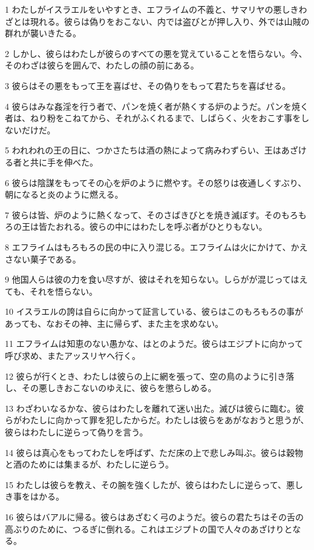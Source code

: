 \par 1 わたしがイスラエルをいやすとき、エフライムの不義と、サマリヤの悪しきわざとは現れる。彼らは偽りをおこない、内では盗びとが押し入り、外では山賊の群れが襲いきたる。
\par 2 しかし、彼らはわたしが彼らのすべての悪を覚えていることを悟らない。今、そのわざは彼らを囲んで、わたしの顔の前にある。
\par 3 彼らはその悪をもって王を喜ばせ、その偽りをもって君たちを喜ばせる。
\par 4 彼らはみな姦淫を行う者で、パンを焼く者が熱くする炉のようだ。パンを焼く者は、ねり粉をこねてから、それがふくれるまで、しばらく、火をおこす事をしないだけだ。
\par 5 われわれの王の日に、つかさたちは酒の熱によって病みわずらい、王はあざける者と共に手を伸べた。
\par 6 彼らは陰謀をもってその心を炉のように燃やす。その怒りは夜通しくすぶり、朝になると炎のように燃える。
\par 7 彼らは皆、炉のように熱くなって、そのさばきびとを焼き滅ぼす。そのもろもろの王は皆たおれる。彼らの中にはわたしを呼ぶ者がひとりもない。
\par 8 エフライムはもろもろの民の中に入り混じる。エフライムは火にかけて、かえさない菓子である。
\par 9 他国人らは彼の力を食い尽すが、彼はそれを知らない。しらがが混じってはえても、それを悟らない。
\par 10 イスラエルの誇は自らに向かって証言している、彼らはこのもろもろの事があっても、なおその神、主に帰らず、また主を求めない。
\par 11 エフライムは知恵のない愚かな、はとのようだ。彼らはエジプトに向かって呼び求め、またアッスリヤへ行く。
\par 12 彼らが行くとき、わたしは彼らの上に網を張って、空の鳥のように引き落し、その悪しきおこないのゆえに、彼らを懲らしめる。
\par 13 わざわいなるかな、彼らはわたしを離れて迷い出た。滅びは彼らに臨む。彼らがわたしに向かって罪を犯したからだ。わたしは彼らをあがなおうと思うが、彼らはわたしに逆らって偽りを言う。
\par 14 彼らは真心をもってわたしを呼ばず、ただ床の上で悲しみ叫ぶ。彼らは穀物と酒のためには集まるが、わたしに逆らう。
\par 15 わたしは彼らを教え、その腕を強くしたが、彼らはわたしに逆らって、悪しき事をはかる。
\par 16 彼らはバアルに帰る。彼らはあざむく弓のようだ。彼らの君たちはその舌の高ぶりのために、つるぎに倒れる。これはエジプトの国で人々のあざけりとなる。

